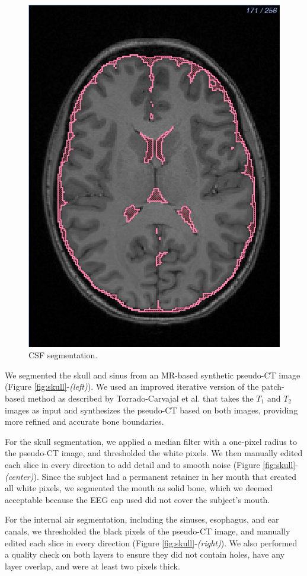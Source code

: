 \begin{figure}[H]
\begin{center}
\includegraphics[width=.49\textwidth]{Figures/CSF_seg}
\caption{CSF segmentation.}
\label{fig:csf}
\end{center}
\end{figure}

We segmented the skull and sinus from an MR-based synthetic pseudo-CT image (Figure \ref{fig:skull}-\textit{(left)}). We used an improved iterative version of the patch-based method as described by Torrado-Carvajal et al. \cite{ref:pseudoct} that takes the $T_1$ and $T_2$ images as input and synthesizes the pseudo-CT based on both images, providing more refined and accurate bone boundaries.

For the skull segmentation, we applied a median filter with a one-pixel radius to the pseudo-CT image, and thresholded the white pixels. We then manually edited each slice in every direction to add detail and to smooth noise (Figure \ref{fig:skull}-\textit{(center)}). Since the subject had a permanent retainer in her mouth that created all white pixels, we segmented the mouth as solid bone, which we deemed acceptable because the EEG cap used did not cover the subject's mouth. 

For the internal air segmentation, including the sinuses, esophagus, and ear canals, we thresholded the black pixels of the pseudo-CT image, and manually edited each slice in every direction (Figure \ref{fig:skull}-\textit{(right)}). We also performed a quality check on both layers to ensure they did not contain holes, have any layer overlap, and were at least two pixels thick.

